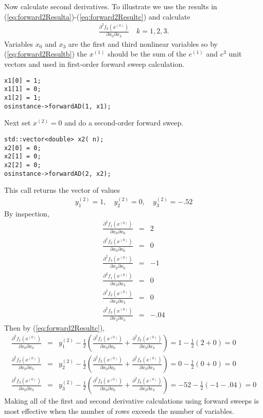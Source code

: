 \documentclass[11pt]{article}
\newcommand{\DD}[3]{ \frac{\partial^2 #1}{\partial #2 \partial #3} }
\renewcommand{\_}{{\char"5F}}
\renewcommand{\{}{{\char"7B}}
\renewcommand{\}}{{\char"7D}}
\renewcommand{\^}{{\char"0D}}
\renewcommand{\'}{{\char"0D}}
\begin{document}
Now calculate second derivatives.  To illustrate we use the results in (\ref{eq:forward2Resulta})-(\ref{eq:forward2Resultc}) and calculate
\begin{eqnarray*}
\DD{f_{k}(x^{(0)})}{x_{0}}{x_{3}} \quad k = 1, 2, 3.
\end{eqnarray*}
Variables $x_{0}$ and $x_{3}$ are the first and third nonlinear variables so by  (\ref{eq:forward2Resultb}) the $x^{(1)}$ should be the sum of the $e^{(1)}$ and $e^{3}$ unit vectors and used in first-order forward sweep calculation.
\begin{verbatim}
x1[0] = 1;
x1[1] = 0;
x1[2] = 1;
osinstance->forwardAD(1, x1);
\end{verbatim}
Next set $x^{(2)} = 0$ and do a second-order forward sweep.
\begin{verbatim}
std::vector<double> x2( n);
x2[0] = 0;
x2[1] = 0;
x2[2] = 0;
osinstance->forwardAD(2, x2);
\end{verbatim}
This call returns the vector of  values
\begin{eqnarray*}
y_{1}^{(2)}  = 1, \quad y_{2}^{(2)}  = 0, \quad y_{3}^{(2)} = -.52
\end{eqnarray*}
By inspection,
\begin{eqnarray*}
\DD{f_{1}(x^{(0)})}{x_{0}}{x_{0}} &=& 2 \\
\DD{f_{2}(x^{(0)})}{x_{0}}{x_{0}} &=&  0\\
\DD{f_{3}(x^{(0)})}{x_{0}}{x_{0}} &=& -1 \\
\DD{f_{1}(x^{(0)})}{x_{3}}{x_{3}} &=& 0 \\
\DD{f_{2}(x^{(0)})}{x_{3}}{x_{3}} &=& 0\\
\DD{f_{3}(x^{(0)})}{x_{3}}{x_{3}} &=& -.04 
\end{eqnarray*}
Then by (\ref{eq:forward2Resultc}),
\begin{eqnarray*}
\DD{f_{1}(x^{(0)})}{x_{0}}{x_{3}} &=&  y_{1}^{(2)}  -  \frac{1}{2} \left( \DD{f_{1}(x^{(0)})}{x_{0}}{x_{0}}  +  \DD{f_{k}(x^{(0)})}{x_{3}}{x_{3}}  \right) =   1 -  \frac{1}{2}(2 +  0) = 0 \\
\DD{f_{2}(x^{(0)})}{x_{0}}{x_{3}} &=&   y_{2}^{(2)}  -  \frac{1}{2} \left( \DD{f_{2}(x^{(0)})}{x_{0}}{x_{0}}  +  \DD{f_{k}(x^{(0)})}{x_{3}}{x_{3}}  \right)  = 0 -  \frac{1}{2}(0 +  0) = 0 \\
\DD{f_{3}(x^{(0)})}{x_{0}}{x_{3}} &=&  y_{3}^{(2)}  -  \frac{1}{2} \left( \DD{f_{3}(x^{(0)})}{x_{0}}{x_{0}}  +  \DD{f_{k}(x^{(0)})}{x_{3}}{x_{3}}  \right) = -52 -  \frac{1}{2}(-1 - .04) = 0
\end{eqnarray*}
Making all of the first and second derivative calculations using forward sweeps is most effective when the number of rows exceeds the number of variables. 
\end{document}
